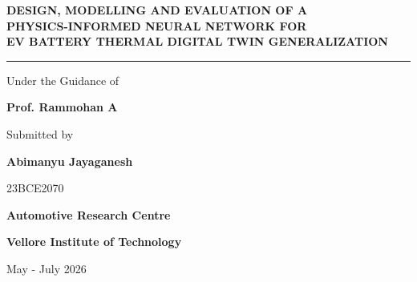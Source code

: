 \documentclass[12pt,a4paper]{article}
\begin{document}
\begin{titlepage}
    \centering
    \vspace*{1.5cm}
    
    {\Large \bfseries DESIGN, MODELLING AND EVALUATION OF A \\ PHYSICS-INFORMED NEURAL NETWORK FOR \\ EV BATTERY THERMAL DIGITAL TWIN GENERALIZATION \par}
    
    \vspace{1.5cm}
    \rule{\linewidth}{0.5pt}
    \vspace{2.0cm}
    
    {\large Under the Guidance of \par}
    \vspace{0.3cm}
    {\large \bfseries Prof. Rammohan A \par}
    
    \vspace{2.0cm}
    
    {\large Submitted by \par}
    \vspace{0.3cm}
    {\large \bfseries Abimanyu Jayaganesh \par}
    {\large 23BCE2070 \par}
    
    \vfill
    
    {\large \bfseries Automotive Research Centre \par}
    {\large \bfseries Vellore Institute of Technology \par}
    
    \vspace{1.0cm}
    {\large May - July 2026 \par}
\end{titlepage}

\setcounter{page}{1}
\end{document}
